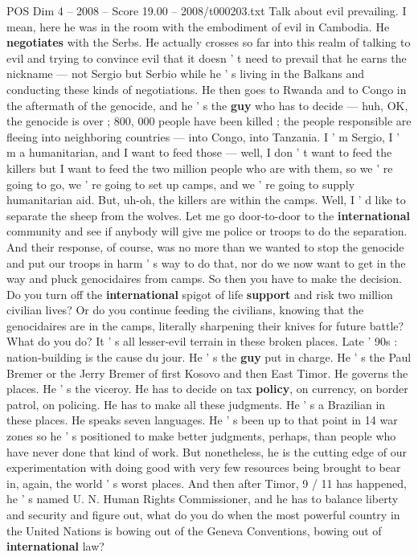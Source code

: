 \begin{textsample}{POS Dim 4 – 2008 – Score 19.00 – 2008/t000203.txt}
Talk about evil prevailing.
I mean, here he was in the room with the embodiment of evil in Cambodia.
He \textbf{negotiates} with the Serbs.
He actually crosses so far into this realm of talking to evil and trying to convince evil that it doesn ' t need to prevail that he earns the nickname — not Sergio but Serbio while he ' s living in the Balkans and conducting these kinds of negotiations.
He then goes to Rwanda and to Congo in the aftermath of the genocide, and he ' s the \textbf{guy} who has to decide — huh, OK, the genocide is over ; 800, 000 people have been killed ; the people responsible are fleeing into neighboring countries — into Congo, into Tanzania.
I ' m Sergio, I ' m a humanitarian, and I want to feed those — well, I don ' t want to feed the killers but I want to feed the two million people who are with them, so we ' re going to go, we ' re going to set up camps, and we ' re going to supply humanitarian aid.
But, uh-oh, the killers are within the camps.
Well, I ' d like to separate the sheep from the wolves.
Let me go door-to-door to the \textbf{international} community and see if anybody will give me police or troops to do the separation.
And their response, of course, was no more than we wanted to stop the genocide and put our troops in harm ' s way to do that, nor do we now want to get in the way and pluck genocidaires from camps.
So then you have to make the decision.
Do you turn off the \textbf{international} spigot of life \textbf{support} and risk two million civilian lives?
Or do you continue feeding the civilians, knowing that the genocidaires are in the camps, literally sharpening their knives for future battle?
What do you do?
It ' s all lesser-evil terrain in these broken places.
Late ' 90s : nation-building is the cause du jour.
He ' s the \textbf{guy} put in charge.
He ' s the Paul Bremer or the Jerry Bremer of first Kosovo and then East Timor.
He governs the places.
He ' s the viceroy.
He has to decide on tax \textbf{policy}, on currency, on border patrol, on policing.
He has to make all these judgments.
He ' s a Brazilian in these places.
He speaks seven languages.
He ' s been up to that point in 14 war zones so he ' s positioned to make better judgments, perhaps, than people who have never done that kind of work.
But nonetheless, he is the cutting edge of our experimentation with doing good with very few resources being brought to bear in, again, the world ' s worst places.
And then after Timor, 9 / 11 has happened, he ' s named U.
N.
Human Rights Commissioner, and he has to balance liberty and security and figure out, what do you do when the most powerful country in the United Nations is bowing out of the Geneva Conventions, bowing out of \textbf{international} law?

\end{textsample}
